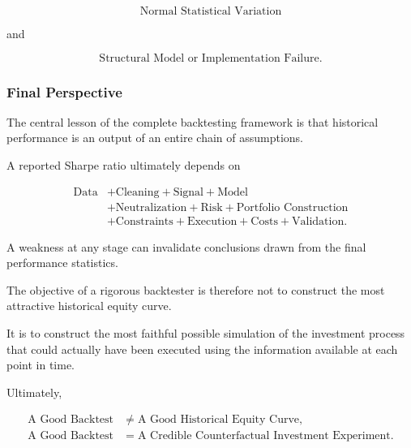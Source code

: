 \documentclass[11pt,a4paper]{article}
\begin{document}
\begin{equation}
\boxed{
\text{Normal Statistical Variation}
}
\end{equation}

and

\begin{equation}
\boxed{
\text{Structural Model or Implementation Failure}.
}
\end{equation}


\subsubsection{Final Perspective}

The central lesson of the complete backtesting framework is that historical
performance is an output of an entire chain of assumptions.

A reported Sharpe ratio ultimately depends on

\begin{equation}
\boxed{
\begin{aligned}
\text{Data}
&+
\text{Cleaning}
+
\text{Signal}
+
\text{Model}
\\
&+
\text{Neutralization}
+
\text{Risk}
+
\text{Portfolio Construction}
\\
&+
\text{Constraints}
+
\text{Execution}
+
\text{Costs}
+
\text{Validation}.
\end{aligned}
}
\end{equation}

A weakness at any stage can invalidate conclusions drawn from the final
performance statistics.

The objective of a rigorous backtester is therefore not to construct the most
attractive historical equity curve.

It is to construct the most faithful possible simulation of the investment
process that could actually have been executed using the information available
at each point in time.

Ultimately,

\begin{equation}
\boxed{
\begin{aligned}
\text{A Good Backtest}
&\neq
\text{A Good Historical Equity Curve},
\\[0.2cm]
\text{A Good Backtest}
&=
\text{A Credible Counterfactual Investment Experiment}.
\end{aligned}
}
\end{equation}
\end{document}
